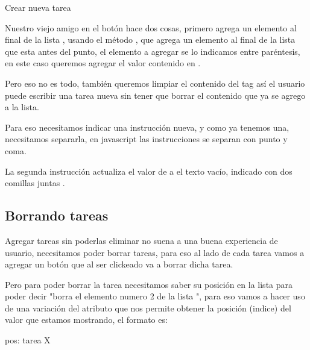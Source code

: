 \documentclass[letterpaper,10pt,spanish]{sphinxmanual}
\begin{document}
%
\begin{sphinxVerbatim}[commandchars=\\\{\}]
 Crear nueva tarea
\end{sphinxVerbatim}

Nuestro viejo amigo  en el botón hace dos cosas, primero agrega un
elemento al final de la lista , usando el método , que agrega un
elemento al final de la lista que esta antes del punto, el elemento a agregar
se lo indicamos entre paréntesis, en este caso queremos agregar el valor
contenido en .

Pero eso no es todo, también queremos limpiar el contenido del tag  así
el usuario puede escribir una tarea nueva sin tener que borrar el contenido
que ya se agrego a la lista.

Para eso necesitamos indicar una instrucción nueva, y como ya tenemos una, necesitamos separarla, en javascript las instrucciones se separan con punto y coma.

La segunda instrucción actualiza el valor de  a el texto vacío,
indicado con dos comillas juntas .


\subsection{Borrando tareas}
\label{\detokenize{un-poco-de-logica-a-la-vista:borrando-tareas}}
Agregar tareas sin poderlas eliminar no suena a una buena experiencia de
usuario, necesitamos poder borrar tareas, para eso al lado de cada tarea vamos
a agregar un botón que al ser clickeado va a borrar dicha tarea.

Pero para poder borrar la tarea necesitamos saber su posición en la lista
para poder decir "borra el elemento numero 2 de la lista ", para
eso vamos a hacer uso de una variación del atributo  que nos permite
obtener la posición (indice) del valor que estamos mostrando, el formato es:

%
\begin{sphinxVerbatim}[commandchars=\\\{\}]
 
    \PYGZob{}\PYGZob{}pos\PYGZcb{}\PYGZcb{}: \PYGZob{}\PYGZob{}tarea\PYGZcb{}\PYGZcb{}
      X
\end{sphinxVerbatim}
\end{document}
